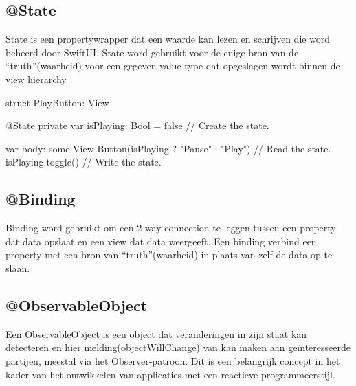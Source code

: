 \subsection{@State}
\autocite{AppleState} State is een propertywrapper dat een waarde kan lezen en schrijven die word beheerd door SwiftUI. State word gebruikt voor de enige bron van de ``truth''(waarheid) voor een gegeven value type dat opgeslagen wordt binnen de view hierarchy.

\begin{swift}[caption=Example of @State code, label=state_example]
    struct PlayButton: View {
        @State private var isPlaying: Bool = false // Create the state.
        
        
        var body: some View {
            Button(isPlaying ? "Pause" : "Play") { // Read the state.
                isPlaying.toggle() // Write the state.
            }
        }
    }
\end{swift}


\subsection{@Binding}
\autocite{AppleBinding} Binding word gebruikt om een 2-way connection te leggen tussen een property dat data opslaat en een view dat data weergeeft. Een binding verbind een property met een bron van ``truth''(waarheid) in plaats van zelf de data op te slaan.



\subsection{@ObservableObject}
\autocite{AppleObservableObject} Een ObservableObject is een object dat veranderingen in zijn staat kan detecteren en hier melding(objectWillChange) van kan maken aan geïnteresseerde partijen, meestal via het Observer-patroon. Dit is een belangrijk concept in het kader van het ontwikkelen van applicaties met een reactieve programmeerstijl.


